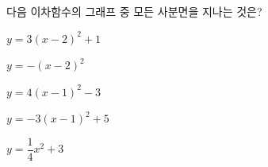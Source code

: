 다음 이차함수의 그래프 중 모든 사분면을 지나는 것은?
\begin{choicesii}{\rule[-3ex]{0pt}{8ex}$y=3(x-2)^2+1$}{\rule[-3ex]{0pt}{8ex}$y=-(x-2)^2$}{\rule[-3ex]{0pt}{8ex}$y=4(x-1)^2-3$}{\rule[-3ex]{0pt}{8ex}$y=-3(x-1)^2+5$}{\rule[-3ex]{0pt}{8ex}$y=\dfrac{1}{4}x^2+3$}\end{choicesii}

